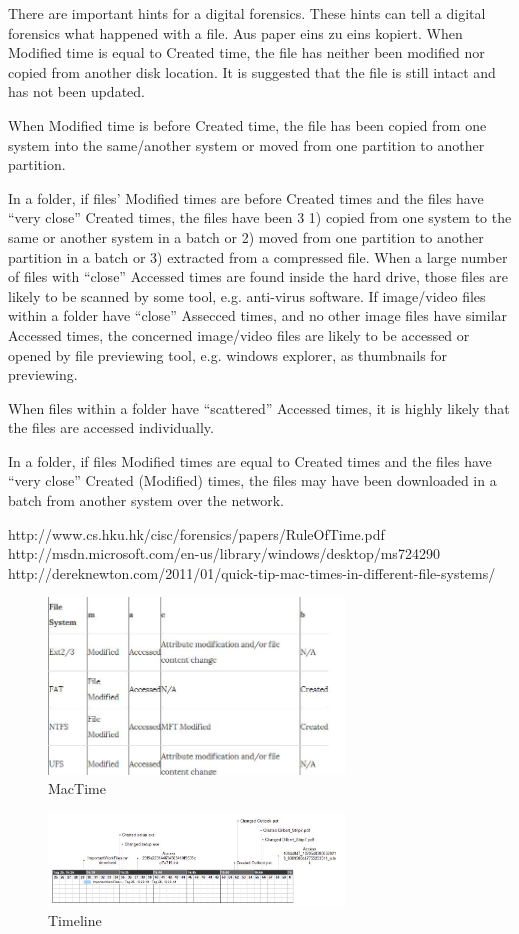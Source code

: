 There are important hints for a digital forensics. These hints can tell a digital forensics what happened with a file. Aus paper eins zu eins kopiert.
When Modified time is equal to Created time, the file has neither been modified nor copied from another disk location. It is suggested that the file is still intact and has not been updated.

When Modified time is before Created time, the file has been copied from one system into the same/another system or moved from one partition to another partition.

In a folder, if files’ Modified times are before Created times and the files have “very close” Created times, the files have been 3
1) copied from one system to the same or another system in a
batch or
2) moved from one partition to another partition in a batch
or
3) extracted from a compressed file.
When a large number of files with “close” Accessed times are found inside the hard drive, those files are likely to be scanned by some tool, e.g. anti-virus software.
If image/video files within a folder have “close” Assecced times, and no other image files have similar Accessed times,
the concerned image/video files are likely to be accessed or opened by file previewing tool, e.g. windows explorer, as
thumbnails for previewing.

When files within a folder have “scattered” Accessed times, it is highly likely that the files are accessed individually.

In a folder, if files Modified times are equal to Created times and the files have “very close” Created (Modified) times, the files may have been downloaded in a batch from another system over the network.

http://www.cs.hku.hk/cisc/forensics/papers/RuleOfTime.pdf
http://msdn.microsoft.com/en-us/library/windows/desktop/ms724290%
http://dereknewton.com/2011/01/quick-tip-mac-times-in-different-file-systems/
\\
\begin{figure}[tbph]
	\centering
	\includegraphics[width=0.7\textwidth]{graphics/mactime}
	\caption{MacTime}
	\label{fig:Mactime}
\end{figure}

\begin{figure}[tbph]
\centering
\includegraphics[width=0.7\textwidth]{graphics/timeline}
\caption{Timeline}
\label{fig:timeline}
\end{figure}
